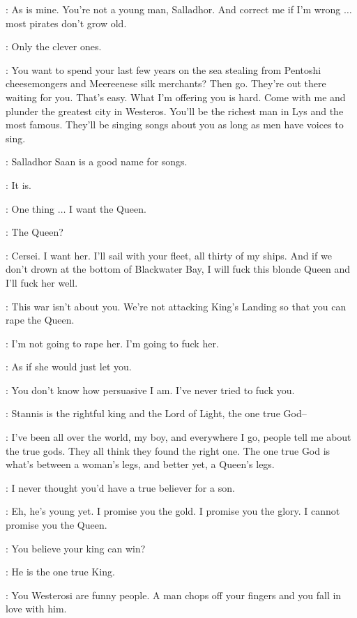 \DAVOS: As is mine. You're not a young man, Salladhor. And correct me if I'm wrong $\ldots$ most pirates don't grow old.

\SALLADHOR: Only the clever ones.

\DAVOS: You want to spend your last few years on the sea stealing from Pentoshi cheesemongers and Meereenese silk merchants? Then go. They're out there waiting for you. That's easy. What I'm offering you is hard. Come with me and plunder the greatest city in Westeros. You'll be the richest man in Lys and the most famous. They'll be singing songs about you as long as men have voices to sing.

\SALLADHOR: Salladhor Saan is a good name for songs.

\DAVOS: It is.

\SALLADHOR: One thing $\ldots$ I want the Queen.

\DAVOS: The Queen?

\SALLADHOR: Cersei. I want her. I'll sail with your fleet, all thirty of my ships. And if we don't drown at the bottom of Blackwater Bay, I will fuck this blonde Queen and I'll fuck her well.

\MATTHOS: This war isn't about you. We're not attacking King's Landing so that you can rape the Queen.

\SALLADHOR: I'm not going to rape her. I'm going to fuck her.

\MATTHOS: As if she would just let you.

\SALLADHOR: You don't know how persuasive I am. I've never tried to fuck you.

\MATTHOS: Stannis is the rightful king and the Lord of Light, the one true God--

\SALLADHOR: I've been all over the world, my boy, and everywhere I go, people tell me about the true gods. They all think they found the right one. The one true God is what's between a woman's legs, and better yet, a Queen's legs.


\SALLADHOR: I never thought you'd have a true believer for a son.

\DAVOS: Eh, he's young yet. I promise you the gold. I promise you the glory. I cannot promise you the Queen.

\SALLADHOR: You believe your king can win?

\DAVOS: He is the one true King.

\SALLADHOR: You Westerosi are funny people. A man chops off your fingers and you fall in love with him.


